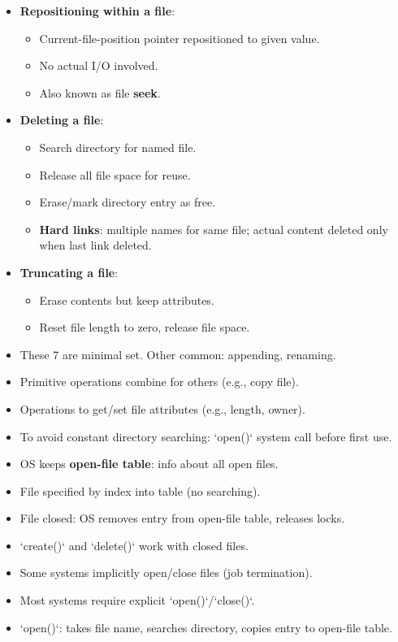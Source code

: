 \begin{itemize}
    \item \textbf{Repositioning within a file}:
    \begin{itemize}
        \item Current-file-position pointer repositioned to given value.
        \item No actual I/O involved.
        \item Also known as file \textbf{seek}.
    \end{itemize}
    \item \textbf{Deleting a file}:
    \begin{itemize}
        \item Search directory for named file.
        \item Release all file space for reuse.
        \item Erase/mark directory entry as free.
        \item \textbf{Hard links}: multiple names for same file; actual content deleted only when last link deleted.
    \end{itemize}
    \item \textbf{Truncating a file}:
    \begin{itemize}
        \item Erase contents but keep attributes.
        \item Reset file length to zero, release file space.
    \end{itemize}
    \item These 7 are minimal set. Other common: appending, renaming.
    \item Primitive operations combine for others (e.g., copy file).
    \item Operations to get/set file attributes (e.g., length, owner).
    \item To avoid constant directory searching: `open()` system call before first use.
    \item OS keeps \textbf{open-file table}: info about all open files.
    \item File specified by index into table (no searching).
    \item File closed: OS removes entry from open-file table, releases locks.
    \item `create()` and `delete()` work with closed files.
    \item Some systems implicitly open/close files (job termination).
    \item Most systems require explicit `open()`/`close()`.
    \item `open()`: takes file name, searches directory, copies entry to open-file table.

\end{itemize}
